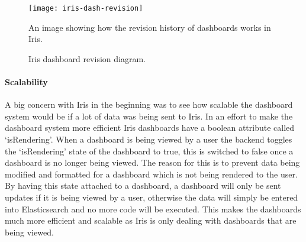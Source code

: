 \documentclass[12pt,a4paper,titlepage]{report}
\begin{document}
\begin{figure}[H]
\begin{tcolorbox}
\begin{center}
\texttt{[image: iris-dash-revision]}
\end{center}
An image showing how the revision history of dashboards works in Iris.
\end{tcolorbox}
\caption{Iris dashboard revision diagram.}
\end{figure}

\paragraph{Scalability}
A big concern with Iris in the beginning was to see how scalable the dashboard system would be if a lot of data was being sent to Iris. In an effort to make the dashboard system more efficient Iris dashboards have a boolean attribute called `isRendering'. When a dashboard is being viewed by a user the backend toggles the `isRendering' state of the dashboard to true, this is switched to false once a dashboard is no longer being viewed. The reason for this is to prevent data being modified and formatted for a dashboard which is not being rendered to the user. By having this state attached to a dashboard, a dashboard will only be sent updates if it is being viewed by a user, otherwise the data will simply be entered into Elasticsearch and no more code will be executed. This makes the dashboards much more efficient and scalable as Iris is only dealing with dashboards that are being viewed.



\end{document}
